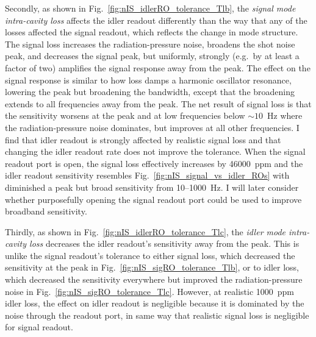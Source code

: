 Secondly, as shown in Fig.~\ref{fig:nIS_idlerRO_tolerance_Tlb}, the \emph{signal mode intra-cavity loss} affects the idler readout differently than the way that any of the losses affected the signal readout, which reflects the change in mode structure. The signal loss increases the radiation-pressure noise, broadens the shot noise peak, and decreases the signal peak, but uniformly, strongly (e.g.\ by at least a factor of two) amplifies the signal response away from the peak. The effect on the signal response is similar to how loss damps a harmonic oscillator resonance, lowering the peak but broadening the bandwidth, except that the broadening extends to all frequencies away from the peak. The net result of signal loss is that the sensitivity worsens at the peak and at low frequencies below $\sim10$~Hz where the radiation-pressure noise dominates, but improves at all other frequencies. I find that idler readout is strongly affected by realistic signal loss and that changing the idler readout rate does not improve the tolerance. When the signal readout port is open, the signal loss effectively increases by 46000~ppm and the idler readout sensitivity resembles Fig.~\ref{fig:nIS_signal_vs_idler_ROs} with diminished a peak but broad sensitivity from 10--1000~Hz. I will later consider whether purposefully opening the signal readout port could be used to improve broadband sensitivity.  %

Thirdly, as shown in Fig.~\ref{fig:nIS_idlerRO_tolerance_Tlc}, the \emph{idler mode intra-cavity loss} decreases the idler readout's sensitivity away from the peak. This is unlike the signal readout's tolerance to either signal loss, which decreased the sensitivity at the peak in Fig.~\ref{fig:nIS_sigRO_tolerance_Tlb}, or to idler loss, which decreased the sensitivity everywhere but improved the radiation-pressure noise in Fig.~\ref{fig:nIS_sigRO_tolerance_Tlc}. %
However, at realistic 1000~ppm idler loss, the effect on idler readout is negligible because it is dominated by the noise through the readout port, in same way that realistic signal loss is negligible for signal readout.

